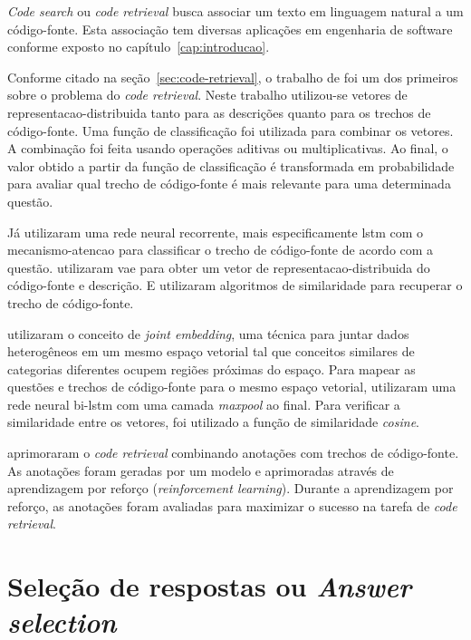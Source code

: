 \textit{Code search} ou \textit{code retrieval} busca associar um texto em linguagem natural a um código-fonte. Esta associação tem diversas aplicações em engenharia de software conforme exposto no capítulo~\ref{cap:introducao}.

Conforme citado na seção~\ref{sec:code-retrieval}, o trabalho de \cite{Allamanis-bimodal-source-code-natural-language:2015} foi um dos primeiros sobre o problema do \textit{code retrieval}. Neste trabalho utilizou-se vetores de \gls{representacao-distribuida} tanto para as descrições quanto para os trechos de código-fonte. Uma função de classificação foi utilizada para combinar os vetores. A combinação foi feita usando operações aditivas ou multiplicativas. Ao final, o valor obtido a partir da função de classificação é transformada em probabilidade para avaliar qual trecho de código-fonte é mais relevante para uma determinada questão.

Já \cite{iyer-etal-2016-summarizing} utilizaram uma rede neural recorrente, mais especificamente \acrshort{lstm} com o \gls{mecanismo-atencao} para classificar o trecho de código-fonte de acordo com a questão. \cite{Chen-bi-variational-autoencoder:2018} utilizaram \acrfull{vae} para obter um vetor de \gls{representacao-distribuida} do código-fonte e descrição. E utilizaram algoritmos de similaridade para recuperar o trecho de código-fonte.

\cite{Gu-deep-code-search:2018} utilizaram o conceito de \textit{joint embedding}, uma técnica para juntar dados heterogêneos em um mesmo espaço vetorial tal que conceitos similares de categorias diferentes ocupem regiões próximas do espaço. Para mapear as questões e trechos de código-fonte para o mesmo espaço vetorial, \cite{Gu-deep-code-search:2018} utilizaram uma rede neural bi-\acrshort{lstm} com uma camada \textit{maxpool} ao final. Para verificar a similaridade entre os vetores, foi utilizado a função de similaridade \textit{cosine}.

\cite{Yao-coacor:2019} aprimoraram o \textit{code retrieval} combinando anotações com trechos de código-fonte. As anotações foram geradas por um modelo e aprimoradas através de aprendizagem por reforço (\textit{reinforcement learning}). Durante a aprendizagem por reforço, as anotações foram avaliadas para maximizar o sucesso na tarefa de \textit{code retrieval}.



\section{Seleção de respostas ou \textit{Answer selection}}
\label{sec:answer-selection}

